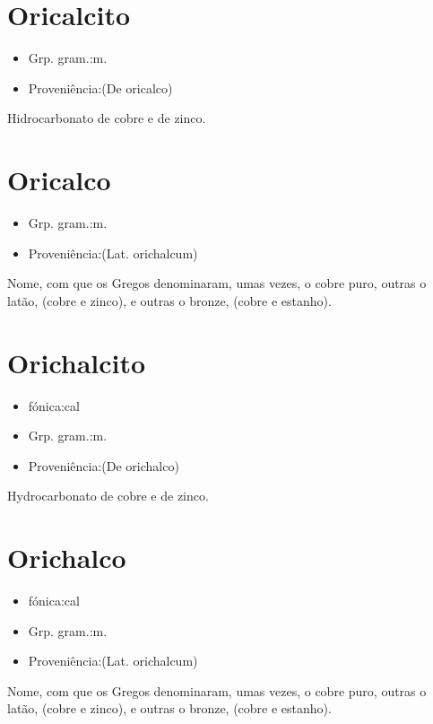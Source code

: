 \section{Oricalcito}
\begin{itemize}
\item {Grp. gram.:m.}
\end{itemize}
\begin{itemize}
\item {Proveniência:(De \textunderscore oricalco\textunderscore )}
\end{itemize}
Hidrocarbonato de cobre e de zinco.
\section{Oricalco}
\begin{itemize}
\item {Grp. gram.:m.}
\end{itemize}
\begin{itemize}
\item {Proveniência:(Lat. \textunderscore orichalcum\textunderscore )}
\end{itemize}
Nome, com que os Gregos denominaram, umas vezes, o cobre puro, outras o latão, (cobre e zinco), e outras o bronze, (cobre e estanho).
\section{Orichalcito}
\begin{itemize}
\item {fónica:cal}
\end{itemize}
\begin{itemize}
\item {Grp. gram.:m.}
\end{itemize}
\begin{itemize}
\item {Proveniência:(De \textunderscore orichalco\textunderscore )}
\end{itemize}
Hydrocarbonato de cobre e de zinco.
\section{Orichalco}
\begin{itemize}
\item {fónica:cal}
\end{itemize}
\begin{itemize}
\item {Grp. gram.:m.}
\end{itemize}
\begin{itemize}
\item {Proveniência:(Lat. \textunderscore orichalcum\textunderscore )}
\end{itemize}
Nome, com que os Gregos denominaram, umas vezes, o cobre puro, outras o latão, (cobre e zinco), e outras o bronze, (cobre e estanho).
